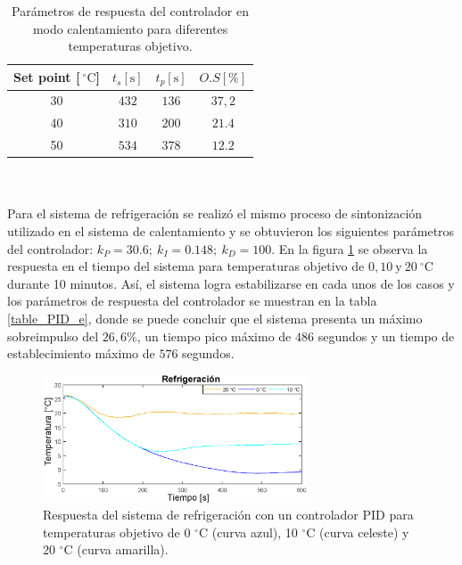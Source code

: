 \begin{table}[htbp]
\caption{Parámetros de respuesta del controlador en modo calentamiento para diferentes temperaturas objetivo.}
    \label{table_PID_c}
	\centering
	\begin{tabular}{ c  c  c c}
    \hline
    Set point [$~^\circ \mbox{C}$]       & $t_s [\mbox{s}]$    & $t_p[\mbox{s}]$     &  $O.S[\%]$    \\ \hline
    \multicolumn{1}{c}{30}      & $432$        & $136$        & $37,2$    \\
    \multicolumn{1}{c}{40}      & $310$        & $200$        & $21.4$   \\
    \multicolumn{1}{c}{50}      & $534$        & $378$        & $12.2$   \\ \hline
	\end{tabular}
\end{table}
\\ \\
Para el sistema de refrigeración se realizó el mismo proceso de sintonización utilizado en el sistema de calentamiento y se obtuvieron los siguientes parámetros del controlador: $k_P= 30.6;~k_I= 0.148;~k_D=100$. En la figura \ref{fig:Respuesta_PID_e} se observa la respuesta en el tiempo del sistema para temperaturas objetivo de $0, 10 ~\mbox{y}~20~^\circ\mbox{C}$ durante 10 minutos. Así, el sistema logra estabilizarse en cada unos de los casos y los parámetros de respuesta del controlador se muestran en la tabla \ref{table_PID_e}, donde se puede concluir que el sistema presenta un máximo sobreimpulso del $26,6\%$, un tiempo pico máximo de $486$ segundos y un tiempo de establecimiento máximo de $576$ segundos.\\
\begin{figure}[h!]
\begin{centering}
  \includegraphics[width=0.7\textwidth]{Images/PID_enfriamiento.eps}
    \caption{Respuesta del sistema de refrigeración con un controlador PID para temperaturas objetivo de 0 $^\circ $C (curva azul), 10 $^\circ $C (curva celeste) y 20 $^\circ $C (curva amarilla).}
    \label{fig:Respuesta_PID_e}
  \par\end{centering}
\end{figure}

